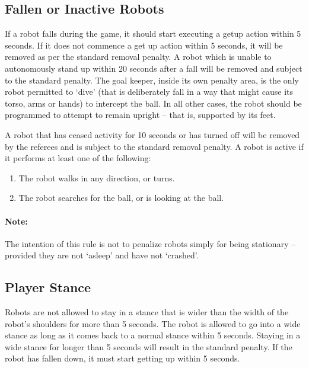 \documentclass[12pt]{article}
\begin{document}
\subsection{Fallen or Inactive Robots}
\label{sec:fallenrobots}

If a robot falls during the game, it should start executing a getup action within 5 seconds. If it does not commence a get up action within 5 seconds, it will be removed as per the standard removal penalty. A robot which is unable to autonomously stand up within 20 seconds after a fall will be removed and subject to the standard penalty. The goal keeper, inside its own penalty area, is the only robot permitted to `dive' (that is deliberately fall in a way that might cause its torso, arms or hands) to intercept the ball. In all other cases, the robot should be programmed to attempt to remain upright -- that is, supported by its feet.

A robot that has ceased activity for 10 seconds or has turned off will be removed by the referees and is subject to the standard removal penalty. A robot is active if it performs at least one of the following:

\begin{enumerate}

\item The robot walks in any direction, or turns.

\item The robot searches for the ball, or is looking at the ball.

\end{enumerate}

\paragraph{Note:} The intention of this rule is not to penalize robots simply for being stationary -- provided they are not `asleep' and have not `crashed'.

\subsection{Player Stance}
\label{sec:player_stance}

Robots are not allowed to stay in a stance that is wider than the width of the robot's shoulders for more than 5 seconds. The robot is allowed to go into a wide stance as long as it comes back to a normal stance within 5 seconds. Staying in a wide stance for longer than 5 seconds will result in the standard penalty. If the robot has fallen down, it must start getting up within 5 seconds. 
\end{document}
